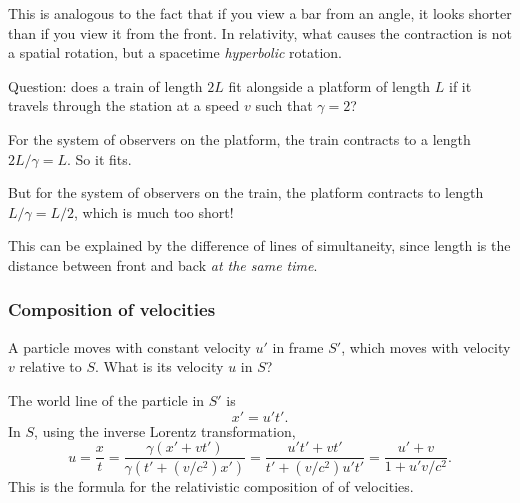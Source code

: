 \documentclass[a4paper]{article}
\begin{document}
This is analogous to the fact that if you view a bar from an angle, it looks shorter than if you view it from the front. In relativity, what causes the contraction is not a spatial rotation, but a spacetime \emph{hyperbolic} rotation.

Question: does a train of length $2L$ fit alongside a platform of length $L$ if it travels through the station at a speed $v$ such that $\gamma = 2$?

For the system of observers on the platform, the train contracts to a length $2L/\gamma = L$. So it fits.

But for the system of observers on the train, the platform contracts to length $L/\gamma = L/2$, which is much too short!

This can be explained by the difference of lines of simultaneity, since length is the distance between front and back \emph{at the same time}.
\begin{center}
\end{center}

\subsubsection*{Composition of velocities}
A particle moves with constant velocity $u'$ in frame $S'$, which moves with velocity $v$ relative to $S$. What is its velocity $u$ in $S$?

The world line of the particle in $S'$ is
\[
  x' = u't'.
\]
In $S$, using the inverse Lorentz transformation,
\[
  u = \frac{x}{t} = \frac{\gamma(x' + vt')}{\gamma(t' + (v/c^2) x')} = \frac{u't' + vt'}{t' + (v/c^2)u't'} = \frac{u' + v}{1 + u'v/c^2}.
\]
This is the formula for the relativistic composition of of velocities.
\end{document}
